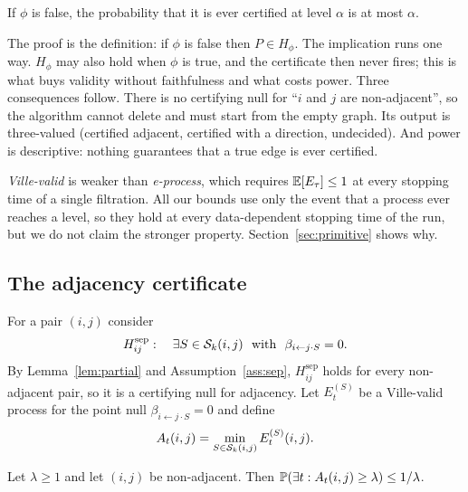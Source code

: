 \begin{proposition}[Soundness]\label{prop:single}
If $\phi$ is false, the probability that it is ever certified at level
$\alpha$ is at most $\alpha$.
\end{proposition}

\noindent The proof is the definition: if $\phi$ is false then $P\in H_\phi$.
The implication runs one way. $H_\phi$ may also hold when $\phi$ is true, and
the certificate then never fires; this is what buys validity without
faithfulness and what costs power. Three consequences follow. There is no
certifying null for ``$i$ and $j$ are non-adjacent'', so the algorithm cannot
delete and must start from the empty graph. Its output is three-valued
(certified adjacent, certified with a direction, undecided). And power is
descriptive: nothing guarantees that a true edge is ever certified.

\emph{Ville-valid} is weaker than \emph{e-process}, which requires
$\mathbb{E}[E_\tau]\le 1$ at every stopping time of a single filtration. All our
bounds use only the event that a process ever reaches a level, so they hold at
every data-dependent stopping time of the run, but we do not claim the
stronger property. Section~\ref{sec:primitive} shows why.

\subsection{The adjacency certificate}\label{sec:adjacency}

For a pair $(i,j)$ consider
\begin{equation}\label{eq:sepnull}
H^{\mathrm{sep}}_{ij}:\quad \exists S\in\mathcal{S}_k(i,j)\ \text{ with }\
\beta_{i\leftarrow j\cdot S}=0 .
\end{equation}
By Lemma~\ref{lem:partial} and Assumption~\ref{ass:sep}, $H^{\mathrm{sep}}_{ij}$
holds for every non-adjacent pair, so it is a certifying null for adjacency.
Let $E^{(S)}_t$ be a Ville-valid process for the point null
$\beta_{i\leftarrow j\cdot S}=0$ and define
\begin{equation}\label{eq:adjacency}
A_t(i,j)=\min_{S\in\mathcal{S}_k(i,j)} E^{(S)}_t(i,j).
\end{equation}

\begin{proposition}\label{prop:adjacency}
Let $\lambda\ge 1$ and let $(i,j)$ be non-adjacent. Then
$\mathbb{P}(\exists t: A_t(i,j)\ge\lambda)\le 1/\lambda$.
\end{proposition}

